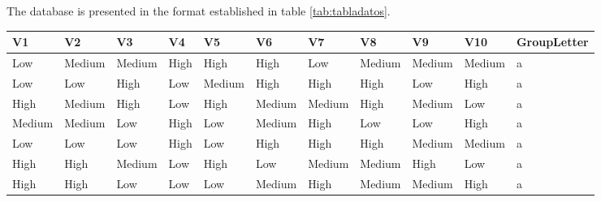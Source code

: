 \documentclass[mathematics,article,submit,moreauthors,pdftex]{mdpi}
\begin{document}
The database is presented in the format established in table
\ref{tab:tabladatos}.

\begin{table}[!ht]
\tiny
\centering
\resizebox{13cm}{!} {
\begin{tabular}{@{}lllllllllll@{}}
\toprule
\textbf{V1}                  & \textbf{V2}                    & \textbf{V3}                  & \textbf{V4}                    & \textbf{V5}                  & \textbf{V6}                    & \textbf{V7}                    & \textbf{V8}                    & \textbf{V9}                    & \textbf{V10}                   & \textbf{GroupLetter}      \\ \midrule
Low      & Medium     & Medium                       & High                           & High                         & High                           & Low                            & Medium                         & Medium                         & Medium                         & a                         \\
Low                          & Low                            & High                         & Low                            & Medium                       & High                           & High                           & High                           & Low                            & High                           & a \\
High & Medium & High & Low    & High & Medium & Medium & High   & Medium & Low    & a                         \\
Medium                       & Medium                         & Low                          & High                           & Low                          & Medium                         & High                           & Low                            & Low                            & High                           & a \\
Low  & Low    & Low  & High   & Low  & High   & High   & High   & Medium & Medium & a                         \\
High                         & High                           & Medium                       & Low                            & High                         & Low                            & Medium                         & Medium                         & High                           & Low                            & a \\
High & High   & Low  & Low    & Low  & Medium & High   & Medium & Medium & High   & a                         \\

\end{tabular}}
\end{table}
\end{document}
